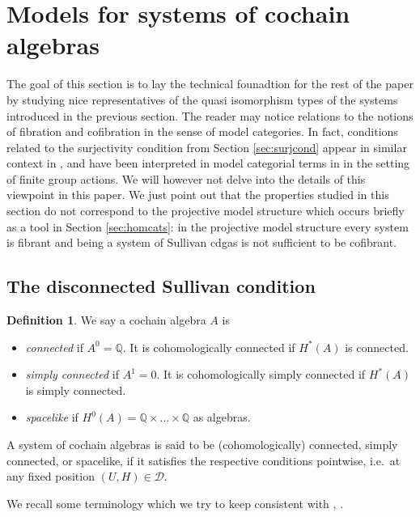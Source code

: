 \documentclass[12pt,a4paper]{article}
\theoremstyle{definition}
\newtheorem{defn}[thm]{Definition}
\begin{document}
\section{Models for systems of cochain algebras}

The goal of this section is to lay the technical founadtion for the rest of the paper by studying nice representatives of the quasi isomorphism types of the systems introduced in the previous section. The reader may notice relations to the notions of fibration and cofibration in the sense of model categories. In fact, conditions related to the surjectivity condition from Section \ref{sec:surjcond} appear in similar context in \cite{ScullS1}, \cite{Triantifillou} and have been interpreted in model categorial terms in \cite{ScullCats} in the setting of finite group actions. We will however not delve into the details of this viewpoint in this paper. We just point out that the properties studied in this section do not correspond to the projective model structure which occurs briefly as a tool in Section \ref{sec:homcats}: in the projective model structure every system is fibrant and being a system of Sullivan cdgas is not sufficient to be cofibrant.

\subsection{The disconnected Sullivan condition}\label{sec:disconnected}

\begin{defn}
We say a cochain algebra $A$ is
\begin{itemize}
\item \emph{connected} if $A^0=\mathbb{Q}$. It is cohomologically connected if $H^*(A)$ is connected.
\item \emph{simply connected} if $A^1=0$. It is cohomologically simply connected if $H^*(A)$ is simply connected.
\item \emph{spacelike} if $H^0(A)=\mathbb{Q}\times\ldots\times \mathbb{Q}$ as algebras.
\end{itemize}
A system of cochain algebras is said to be (cohomologically) connected, simply connected, or spacelike, if it satisfies the respective conditions pointwise, i.e.\ at any fixed position $(U,H)\in\mathcal{D}$.
\end{defn}

We recall some terminology which we try to keep consistent with \cite{BibelI}, \cite{BibelII}.
\end{document}
